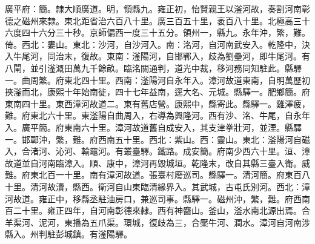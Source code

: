 \begin{pinyinscope}
廣平府：簡。隸大順廣道。明，領縣九。雍正初，怡賢親王以滏河故，奏割河南彰德之磁州來隸。東北距省治六百八十里。廣三百五十里，袤百八十里。北極高三十六度四十六分三十秒。京師偏西一度三十五分。領州一，縣九。永年沖，繁，難。倚。西北：婁山。東北：沙河，自沙河入。南：洺河，自河南武安入。乾隆中，決入牛尾河，同治末，復故。東南：滏陽河，自邯鄲入，歧為劉壘河，即牛尾河。有八閘，並引滏溉田萬九千餘畝。臨洺關通判，道光中裁，移河務同知駐此。縣驛一。曲周繁。府東北四十里。西南：滏陽河自永年入。漳河故道東南，自明萬歷初挾滏而北，康熙十年始南徙，四十七年益南，逕大名、元城。縣驛一。肥鄉簡。府東南四十里。東西漳河故道二。東有舊店營。康熙中，縣寄此。縣驛一。雞澤疲，難。府東北六十里。東滏陽自曲周入，右導為興隆河。西有沙、洺、牛尾，自永年入。廣平簡。府東南六十里。漳河故道舊自成安入，其支津拳壯河，並湮。縣驛一。邯鄲沖，繁，難。府西南五十里。西北：紫山。西：靈山。東北：滏陽河自磁入，合渚河、沁河、輸黿河。有叢臺驛。鐵路。成安簡。府南少西六十里。洹、漳故道並自河南臨漳入。順、康中，漳河再毀城垣。乾隆末，改自其縣三臺入衛。威難。府東北百一十里。南有漳河故道。張臺村廢巡司。縣驛一。清河簡。府東百八十里。清河故瀆，縣西。衛河自山東臨清緣界入。其武城，古屯氏別河。西北：漳河故道。雍正中，移縣丞駐油房口，兼巡司事。縣驛一。磁州沖，繁，難。府西南百二十里。雍正四年，自河南彰德來隸。西有神麕山。釜山，滏水南北源出焉。合羊渠河、泥河，東播為五爪渠。環城，復歧為三，合檿牛河、澗水。漳河自河南涉縣入。州判駐彭城鎮。有滏陽驛。


\end{pinyinscope}
